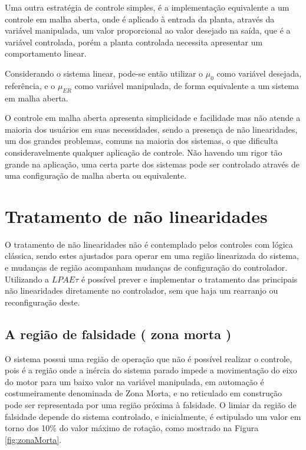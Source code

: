 Uma outra estratégia de controle simples, 
é a implementação equivalente a um controle em malha aberta,
onde é aplicado à entrada da planta, 
através da variável manipulada,
um valor proporcional ao valor desejado na saída,
que é a variável controlada, 
porém a planta controlada necessita apresentar um 
comportamento linear. 

Considerando o sistema linear,
pode-se então utilizar o $\mu_0$ como variável desejada, referência,
e o $\mu_{ER}$ como variável manipulada,
de forma equivalente a um sistema em malha aberta.

O controle em malha aberta apresenta simplicidade e facilidade mas
não atende a maioria dos usuários em suas necessidades,
sendo a presença de não linearidades,
um dos grandes problemas, 
comuns na maioria dos sistemas,
o que dificulta consideravelmente qualquer aplicação de controle.
Não havendo um rigor tão grande na aplicação,
uma certa parte dos sistemas pode ser controlado através de
uma configuração de malha aberta ou equivalente.



\section{Tratamento de não linearidades}

O tratamento de não linearidades não é contemplado pelos controles com lógica clássica,
sendo estes ajustados para operar em uma região linearizada do sistema,
e mudanças de região acompanham mudanças de configuração do controlador.
Utilizando a $LPAE\tau$ é possível prever e implementar o tratamento
das principais não linearidades diretamente no controlador,
sem que haja um rearranjo ou reconfiguração deste.

\subsection{A região de falsidade ( zona morta )}

O sistema possui uma região de operação 
que não é possível realizar o controle, 
pois é a região onde a inércia do sistema parado
impede a movimentação do eixo do motor para um baixo valor na variável manipulada,
em automação é costumeiramente denominada de Zona Morta, 
e no reticulado em construção pode ser representada por uma região
próxima à falsidade.
O limiar da região de falsidade depende do sistema controlado,
e inicialmente, é estipulado um valor em torno dos 10\% do valor máximo de rotação,
como mostrado na Figura \ref{fig:zonaMorta}.





